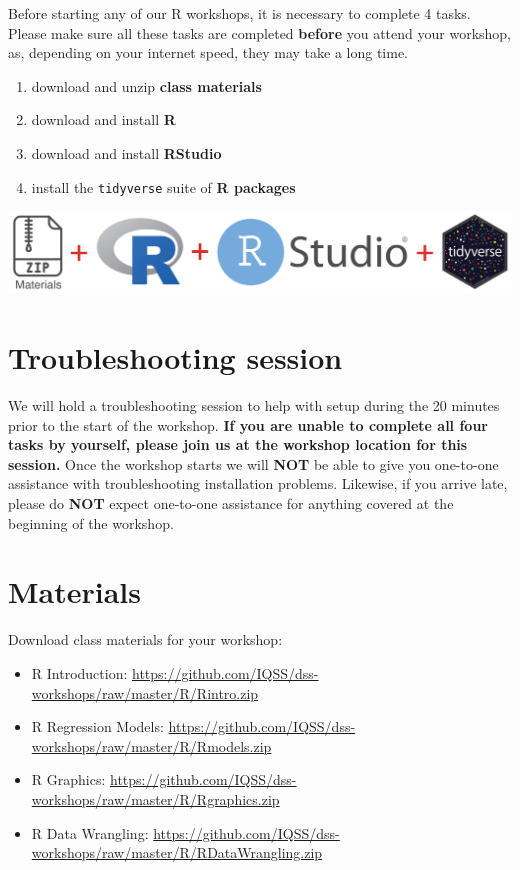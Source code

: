 \documentclass[
]{book}
\providecommand{\tightlist}{%
  \setlength{\itemsep}{0pt}\setlength{\parskip}{0pt}}
\begin{document}
Before starting any of our R workshops, it is necessary to complete 4 tasks. Please make sure all these tasks are completed \textbf{before} you attend your workshop, as, depending on your internet speed, they may take a long time.

\begin{enumerate}
\def\labelenumi{\arabic{enumi}.}
\tightlist
\item
  download and unzip \textbf{class materials}
\item
  download and install \textbf{R}
\item
  download and install \textbf{RStudio}
\item
  install the \texttt{tidyverse} suite of \textbf{R packages}
\end{enumerate}

\includegraphics{R/Rinstall/images/install_software_R.png}

\hypertarget{troubleshooting-session}{%
\section{Troubleshooting session}\label{troubleshooting-session}}

We will hold a troubleshooting session to help with setup during the 20 minutes prior to the start of the workshop.
\textbf{If you are unable to complete all four tasks by yourself, please join us at the workshop location for this session.}
Once the workshop starts we will \textbf{NOT} be able to give you one-to-one assistance with troubleshooting installation problems. Likewise, if you arrive late, please do \textbf{NOT} expect one-to-one assistance for anything covered at the beginning of the workshop.

\hypertarget{materials}{%
\section{Materials}\label{materials}}

Download class materials for your workshop:

\begin{itemize}
\tightlist
\item
  R Introduction: \url{https://github.com/IQSS/dss-workshops/raw/master/R/Rintro.zip}
\item
  R Regression Models: \url{https://github.com/IQSS/dss-workshops/raw/master/R/Rmodels.zip}
\item
  R Graphics: \url{https://github.com/IQSS/dss-workshops/raw/master/R/Rgraphics.zip}
\item
  R Data Wrangling: \url{https://github.com/IQSS/dss-workshops/raw/master/R/RDataWrangling.zip}
\end{itemize}
\end{document}
